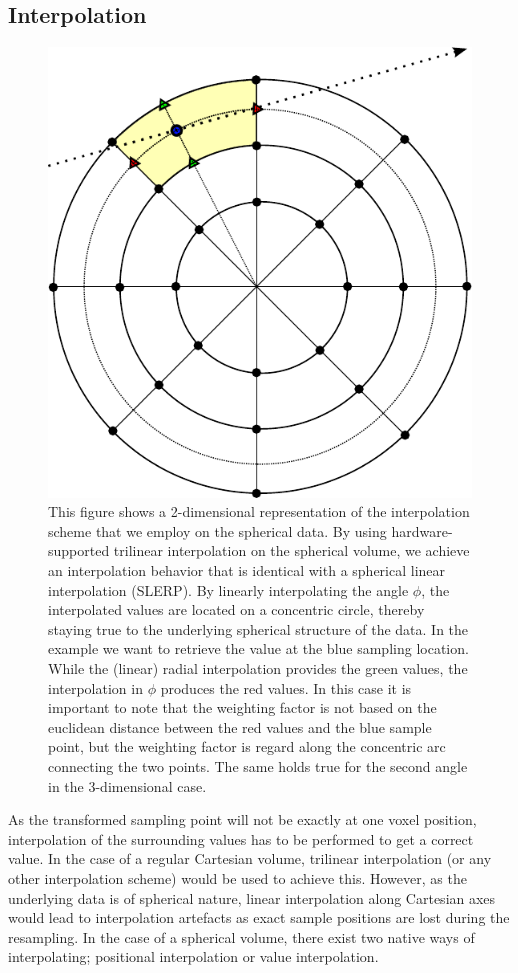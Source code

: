 \documentclass{egpubl}
\begin{document}
\subsection{Interpolation}
\label{sec:interpolation}
\begin{figure}
	\centering
	\includegraphics[width=0.75\columnwidth]{figures/spherical_interpolation.pdf}
	\caption{This figure shows a 2-dimensional representation of the interpolation scheme that we employ on the spherical data. By using hardware-supported trilinear interpolation on the spherical volume, we achieve an interpolation behavior that is identical with a spherical linear interpolation (SLERP). By linearly interpolating the angle $\phi$, the interpolated values are located on a concentric circle, thereby staying true to the underlying spherical structure of the data. In the example we want to retrieve the value at the blue sampling location. While the (linear) radial interpolation provides the green values, the interpolation in $\phi$ produces the red values. In this case it is important to note that the weighting factor is not based on the euclidean distance between the red values and the blue sample point, but the weighting factor is regard along the concentric arc connecting the two points. The same holds true for the second angle in the 3-dimensional case.}
	\label{fig:interpolation}
\end{figure}

As the transformed sampling point will not be exactly at one voxel position, interpolation of the surrounding values has to be performed to get a correct value. In the case of a regular Cartesian volume, trilinear interpolation (or any other interpolation scheme) would be used to achieve this. However, as the underlying data is of spherical nature, linear interpolation along Cartesian axes would lead to interpolation artefacts as exact sample positions are lost during the resampling. In the case of a spherical volume, there exist two native ways of interpolating; positional interpolation or value interpolation.
\end{document}
